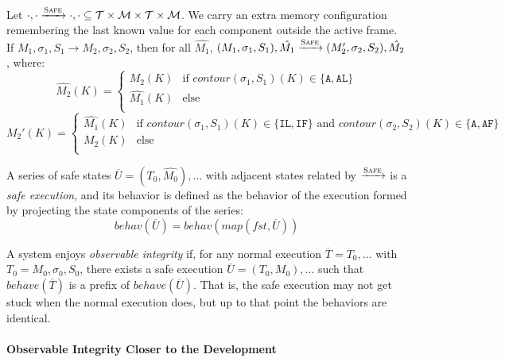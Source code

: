 \documentclass{article}
\begin{document}
      Let \(\cdot,\cdot \xrightarrow{\text{\sc Safe}} \cdot,\cdot \subseteq
      \mathcal{T} \times \mathcal{M} \times \mathcal{T} \times \mathcal{M}\). We carry an
      extra memory configuration remembering the last known value for each component outside the active
      frame. If \(M_1,\sigma_1,S_1 \longrightarrow M_2,\sigma_2,S_2\), then for all \(\hat{M_1}\),
      \((M_1,\sigma_1,S_1),\hat{M_1} \xrightarrow{\text{\sc Safe}} (M_2',\sigma_2,S_2),\hat{M_2}\), where:
      \[\hat{M_2}(K) =
        \begin{cases}
          M_2(K) & \text{if } \mathit{contour}(\sigma_1,S_1)(K) \in \{\mathtt{A},\mathtt{AL}\} \\
          \hat{M_1}(K) & \text{else} \\
        \end{cases}\]
      \[M_2'(K) =
        \begin{cases}
          \hat{M_1}(K) & \text{if } \mathit{contour}(\sigma_1,S_1)(K) \in \{\mathtt{IL},\mathtt{IF}\} \text{ and }
            \mathit{contour}(\sigma_2,S_2)(K) \in \{\mathtt{A},\mathtt{AF}\} \\
          M_2(K) & \text{else} \\
        \end{cases}\]

      A series of safe states \(\overline{U} = (T_0,\hat{M_0}), \ldots\) with adjacent states related by
      \(\xrightarrow{\text{\sc Safe}}\) is a \emph{safe execution}, and its behavior is defined as the behavior
      of the execution formed by projecting the state components of the series:
      \[\mathit{behav}(\overline{U}) = \mathit{behav(map(fst,\overline{U}))}\]

      A system enjoys {\it observable integrity} if, for any normal execution \(\overline{T} = T_0,\ldots\) with
      \(T_0 = M_0,\sigma_0,S_0\), there exists a safe execution \(\overline{U} = (T_0,M_0),\ldots\) such that
      \(\mathit{behave}(\overline{T})\) is a prefix of \(\mathit{behave}(\overline{U})\). That is, the safe execution
      may not get stuck when the normal execution does, but up to that point the behaviors are identical.

    \paragraph{Observable Integrity Closer to the Development}
\end{document}
